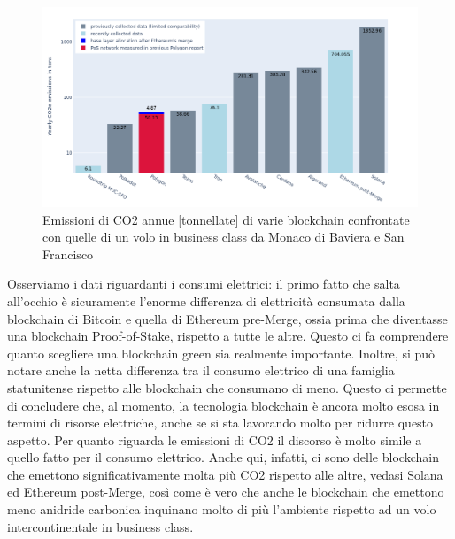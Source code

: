 \documentclass[12pt]{report}
\begin{document}
\begin{figure}[H]
    \centering
    \includegraphics[width=1.1\textwidth]{CO2.png}
    \captionsetup{justification=centering}
    \caption{Emissioni di CO2 annue [tonnellate] di varie blockchain confrontate con quelle di un volo in business class da Monaco di Baviera e San Francisco \cite{Tredici}}
    \label{fig:CO2}
\end{figure}\newpage

\noindent
Osserviamo i dati riguardanti i consumi elettrici: il primo fatto che salta all'occhio è sicuramente l'enorme differenza di elettricità consumata dalla blockchain di Bitcoin e quella di Ethereum pre-Merge, ossia prima che diventasse una blockchain Proof-of-Stake, rispetto a tutte le altre. Questo ci fa comprendere quanto scegliere una blockchain green sia realmente importante.\newline
Inoltre, si può notare anche la netta differenza tra il consumo elettrico di una famiglia statunitense rispetto alle blockchain che consumano di meno. Questo ci permette di concludere che, al momento, la tecnologia blockchain è ancora molto esosa in termini di risorse elettriche, anche se si sta lavorando molto per ridurre questo aspetto.\newline\newline
Per quanto riguarda le emissioni di CO2 il discorso è molto simile a quello fatto per il consumo elettrico. Anche qui, infatti, ci sono delle blockchain che emettono significativamente molta più CO2 rispetto alle altre, vedasi Solana ed Ethereum post-Merge, così come è vero che anche le blockchain che emettono meno anidride carbonica inquinano molto di più l'ambiente rispetto ad un volo intercontinentale in business class.\newpage
\end{document}
